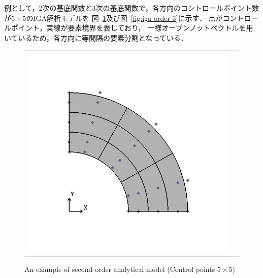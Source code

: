 \newpage

例として，2次の基底関数と3次の基底関数で，各方向のコントロールポイント数が$5\times 5$のIGA解析モデルを
図~\ref{fig:iga order 2}及び図~\ref{fig:iga order 3}に示す．
点がコントロールポイント，実線が要素境界を表しており，
一様オープンノットベクトルを用いているため，各方向に等間隔の要素分割となっている．

\begin{figure}[htbp]
  \begin{tabular}{cc}
    \begin{minipage}[t]{0.45\hsize}
      \centering
      \includegraphics[keepaspectratio, scale=0.3]
      {fig/result_data_etc/iga/order2/model.png}
      \caption{An example of second-order analytical model (Control points $5\times 5$)}
      \label{fig:iga order 2}
    \end{minipage} &
    \begin{minipage}[t]{0.45\hsize}
      \centering

\end{minipage}
\end{tabular}
\end{figure}
